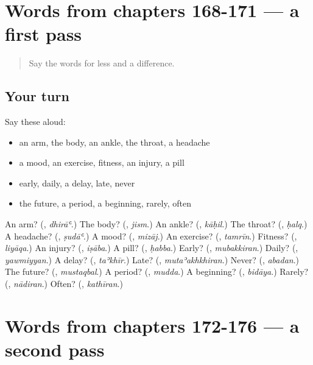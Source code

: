 \section[(dialogue)]{Words from chapters 168-171 — a first pass}

\label{lesson:AR-R176-first-pass-words-from-chapters-168-171}



\begin{quote}
Say the words for less and a difference.
\end{quote}

\subsection*{Your turn}
Say these aloud:

\begin{itemize}
\raggedright
  \item an arm, the body, an ankle, the throat, a headache
  \item a mood, an exercise, fitness, an injury, a pill
  \item early, daily, a delay, late, never
  \item the future, a period, a beginning, rarely, often
\end{itemize}

\begin{tcolorbox}[breakable,colback=teal!4,colframe=teal!35!black,title={Before you move on}]
An arm? (\textbf{}, \emph{dhirāʿ}.) The body? (\textbf{}, \emph{jism}.) An ankle? (\textbf{}, \emph{kāḥil}.) The throat? (\textbf{}, \emph{ḥalq}.) A headache? (\textbf{}, \emph{ṣudāʿ}.) A mood? (\textbf{}, \emph{mizāj}.) An exercise? (\textbf{}, \emph{tamrīn}.) Fitness? (\textbf{}, \emph{liyāqa}.) An injury? (\textbf{}, \emph{iṣāba}.) A pill? (\textbf{}, \emph{ḥabba}.) Early? (\textbf{}, \emph{mubakkiran}.) Daily? (\textbf{}, \emph{yawmiyyan}.) A delay? (\textbf{}, \emph{taʾkhīr}.) Late? (\textbf{}, \emph{mutaʾakhkhiran}.) Never? (\textbf{}, \emph{abadan}.) The future? (\textbf{}, \emph{mustaqbal}.) A period? (\textbf{}, \emph{mudda}.) A beginning? (\textbf{}, \emph{bidāya}.) Rarely? (\textbf{}, \emph{nādiran}.) Often? (\textbf{}, \emph{kathīran}.)
\end{tcolorbox}
\section[(dialogue)]{Words from chapters 172-176 — a second pass}

